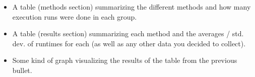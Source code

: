 \documentclass[paper=a4, fontsize=11pt, parskip=full]{scrartcl} %
\numberwithin{equation}{section} %
\numberwithin{figure}{section} %
\numberwithin{table}{section} %
\begin{document}
\begin{itemize}
	\item A table (methods section) summarizing the different methods and how many execution runs were done in each group.
	\item A table (results section) summarizing each method and the averages / std. dev. of runtimes for each (as well as any other data you decided to collect).
	\item Some kind of graph visualizing the results of the table from the previous bullet.
\end{itemize}


\end{document}

